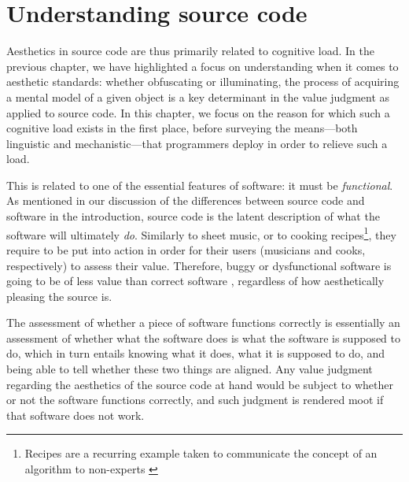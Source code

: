 \chapter{Understanding source code}
\label{chap:understanding}

Aesthetics in source code are thus primarily related to cognitive load. In the previous chapter, we have highlighted a focus on understanding when it comes to aesthetic standards: whether obfuscating or illuminating, the process of acquiring a mental model of a given object is a key determinant in the value judgment as applied to source code. In this chapter, we focus on the reason for which such a cognitive load exists in the first place, before surveying the means—both linguistic and mechanistic—that programmers deploy in order to relieve such a load.

This is related to one of the essential features of software: it must be \emph{functional}. As mentioned in our discussion of the differences between source code and software in the introduction, source code is the latent description of what the software will ultimately \emph{do}. Similarly to sheet music, or to cooking recipes\footnote{Recipes are a recurring example taken to communicate the concept of an algorithm to non-experts \citep{zeller_algorithms_2020}}, they require to be put into action in order for their users (musicians and cooks, respectively) to assess their value. Therefore, buggy or dysfunctional software is going to be of less value than correct software \citep{hill_what_2016}, regardless of how aesthetically pleasing the source is.

The assessment of whether a piece of software functions correctly is essentially an assessment of whether what the software does is what the software is supposed to do, which in turn entails knowing what it does, what it is supposed to do, and being able to tell whether these two things are aligned. Any value judgment regarding the aesthetics of the source code at hand would be subject to whether or not the software functions correctly, and such judgment is rendered moot if that software does not work.

